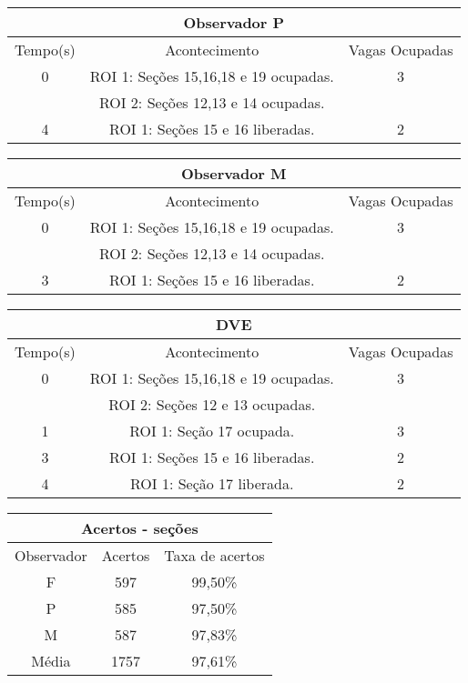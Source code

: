 \begin{center}
\begin{tabular}{|c||c||c|}
\hline
\multicolumn{3}{|c|}{Observador P}  \\ \hline \hline
Tempo(s) & Acontecimento & Vagas Ocupadas\\ \hline
0 & ROI 1: Seções 15,16,18 e 19 ocupadas. & 3 \\
 & ROI 2: Seções 12,13 e 14 ocupadas. &  \\ \hline
4 & ROI 1: Seções 15 e 16 liberadas. & 2 \\
\hline
\end{tabular}
\end{center}

\begin{center}
\begin{tabular}{|c||c||c|}
\hline
\multicolumn{3}{|c|}{Observador M}  \\ \hline \hline
Tempo(s) & Acontecimento & Vagas Ocupadas\\ \hline
0 & ROI 1: Seções 15,16,18 e 19 ocupadas. & 3 \\
 & ROI 2: Seções 12,13 e 14 ocupadas. &  \\ \hline
3 & ROI 1: Seções 15 e 16 liberadas. & 2 \\
\hline
\end{tabular}
\end{center}

\begin{center}
\begin{tabular}{|c||c||c|}
\hline
\multicolumn{3}{|c|}{DVE}  \\ \hline \hline
Tempo(s) & Acontecimento & Vagas Ocupadas\\ \hline
0 & ROI 1: Seções 15,16,18 e 19 ocupadas. & 3 \\
 & ROI 2: Seções 12 e 13 ocupadas. &  \\ \hline
1 & ROI 1: Seção 17 ocupada. & 3 \\ \hline
3 & ROI 1: Seções 15 e 16 liberadas. & 2 \\ \hline
4 & ROI 1: Seção 17 liberada. & 2 \\
\hline
\end{tabular}
\end{center}

\begin{center}
\begin{tabular}{|c||c||c|}
\hline
\multicolumn{3}{|c|}{Acertos - seções}  \\ \hline
Observador & Acertos & Taxa de acertos \\ \hline
F & 597 & 99,50\% \\  \hline
P & 585 & 97,50\% \\ \hline
M & 587 & 97,83\% \\ \hline
Média & 1757 & 97,61\% \\
\hline
\end{tabular}
\end{center}

